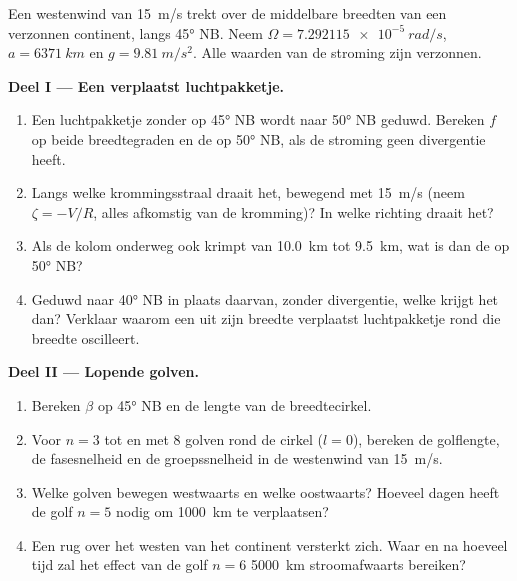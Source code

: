 \begin{problem}
\label{pb:b3:atmospheric-dynamics:1}
Een westenwind van \qty{15}{m/s} trekt over de middelbare breedten van een
verzonnen continent, langs \ang{45} NB. Neem $\Omega =
\qty{7.292115e-5}{rad/s}$, $a = \qty{6371}{km}$ en $g = \qty{9.81}{m/s^2}$.
Alle waarden van de stroming zijn verzonnen.

\medskip\noindent\textbf{Deel I --- Een verplaatst luchtpakketje.}
\begin{enumerate}
\item Een luchtpakketje zonder  op \ang{45} NB wordt naar
  \ang{50} NB geduwd. Bereken $f$ op beide breedtegraden en de  op
  \ang{50} NB, als de stroming geen divergentie heeft.
\item Langs welke krommingsstraal draait het, bewegend met \qty{15}{m/s}
  (neem $\zeta = -V/R$, alles afkomstig van de kromming)? In welke richting draait het?
\item Als de kolom onderweg ook krimpt van \qty{10.0}{km} tot \qty{9.5}{km},
  wat is dan de  op \ang{50} NB?
\item Geduwd naar \ang{40} NB in plaats daarvan, zonder divergentie, welke  krijgt het dan? Verklaar waarom een uit zijn breedte verplaatst luchtpakketje
  rond die breedte oscilleert.
\end{enumerate}

\medskip\noindent\textbf{Deel II --- Lopende golven.}
\begin{enumerate}[resume]
\item Bereken $\beta$ op \ang{45} NB en de lengte van de breedtecirkel.
\item Voor $n = 3$ tot en met 8 golven rond de cirkel ($l = 0$), bereken de
  golflengte, de fasesnelheid en de groepssnelheid in de westenwind van
  \qty{15}{m/s}.
\item Welke golven bewegen westwaarts en welke oostwaarts? Hoeveel dagen
  heeft de golf $n = 5$ nodig om \qty{1000}{km} te verplaatsen?
\item Een rug over het westen van het continent versterkt zich. Waar en na hoeveel
  tijd zal het effect van de golf $n = 6$ \qty{5000}{km}
  stroomafwaarts bereiken?
\end{enumerate}


\end{problem}
